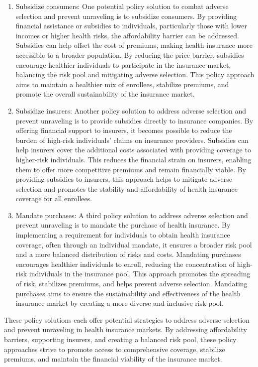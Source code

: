 \documentclass[
  letterpaper,
  DIV=11,
  numbers=noendperiod]{scrreport}
\theoremstyle{definition}
\theoremstyle{remark}
\begin{document}
\begin{enumerate}
\def\labelenumi{\arabic{enumi}.}
\item
  Subsidize consumers: One potential policy solution to combat adverse
  selection and prevent unraveling is to subsidize consumers. By
  providing financial assistance or subsidies to individuals,
  particularly those with lower incomes or higher health risks, the
  affordability barrier can be addressed. Subsidies can help offset the
  cost of premiums, making health insurance more accessible to a broader
  population. By reducing the price barrier, subsidies encourage
  healthier individuals to participate in the insurance market,
  balancing the risk pool and mitigating adverse selection. This policy
  approach aims to maintain a healthier mix of enrollees, stabilize
  premiums, and promote the overall sustainability of the insurance
  market.
\item
  Subsidize insurers: Another policy solution to address adverse
  selection and prevent unraveling is to provide subsidies directly to
  insurance companies. By offering financial support to insurers, it
  becomes possible to reduce the burden of high-risk individuals' claims
  on insurance providers. Subsidies can help insurers cover the
  additional costs associated with providing coverage to higher-risk
  individuals. This reduces the financial strain on insurers, enabling
  them to offer more competitive premiums and remain financially viable.
  By providing subsidies to insurers, this approach helps to mitigate
  adverse selection and promotes the stability and affordability of
  health insurance coverage for all enrollees.
\item
  Mandate purchases: A third policy solution to address adverse
  selection and prevent unraveling is to mandate the purchase of health
  insurance. By implementing a requirement for individuals to obtain
  health insurance coverage, often through an individual mandate, it
  ensures a broader risk pool and a more balanced distribution of risks
  and costs. Mandating purchases encourages healthier individuals to
  enroll, reducing the concentration of high-risk individuals in the
  insurance pool. This approach promotes the spreading of risk,
  stabilizes premiums, and helps prevent adverse selection. Mandating
  purchases aims to ensure the sustainability and effectiveness of the
  health insurance market by creating a more diverse and inclusive risk
  pool.
\end{enumerate}

These policy solutions each offer potential strategies to address
adverse selection and prevent unraveling in health insurance markets. By
addressing affordability barriers, supporting insurers, and creating a
balanced risk pool, these policy approaches strive to promote access to
comprehensive coverage, stabilize premiums, and maintain the financial
viability of the insurance market.
\end{document}
